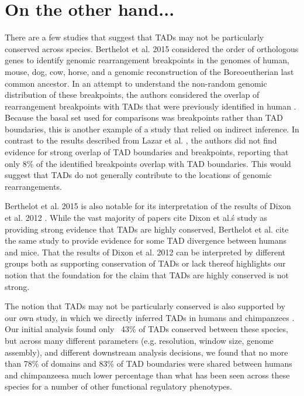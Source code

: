 \section{On the other hand...}
There are a few studies that suggest that TADs may not be particularly conserved across species. Berthelot et al. 2015 \cite{Berthelot.2015} considered the order of orthologous genes to identify genomic rearrangement breakpoints in the genomes of human, mouse, dog, cow, horse, and a genomic reconstruction of the Boreoeutherian last common ancestor. In an attempt to understand the non-random genomic distribution of these breakpoints, the authors considered the overlap of rearrangement breakpoints with TADs that were previously identified in human \cite{Dixon.2012}. Because the basal set used for comparisons was breakpoints rather than TAD boundaries, this is another example of a study that relied on indirect inference. In contrast to the results described from Lazar et al. \cite{Lazar.2018}, the authors did not find evidence for strong overlap of TAD boundaries and breakpoints, reporting that only 8\% of the identified breakpoints overlap with TAD boundaries. This would suggest that TADs do not generally contribute to the locations of genomic rearrangements.

Berthelot et al. 2015 \cite{Berthelot.2015} is also notable for its interpretation of the results of Dixon et al. 2012 \cite{Dixon.2012}. While the vast majority of papers cite Dixon et al.\'s study as providing strong evidence that TADs are highly conserved, Berthelot et al. cite the same study to provide evidence for some TAD divergence between humans and mice. That the results of Dixon et al. 2012 can be interpreted by different groups both as supporting conservation of TADs or lack thereof highlights our notion that the foundation for the claim that TADs are highly conserved is not strong.

The notion that TADs may not be particularly conserved is also supported by our own study, in which we directly inferred TADs in humans and chimpanzees \cite{Eres.2019}. Our initial analysis found only ~43\% of TADs conserved between these species, but across many different parameters (e.g. resolution, window size, genome assembly), and different downstream analysis decisions, we found that no more than 78\% of domains and 83\% of TAD boundaries were shared between humans and chimpanzees{\textemdash}a much lower percentage than what has been seen across these species for a number of other functional regulatory phenotypes.

